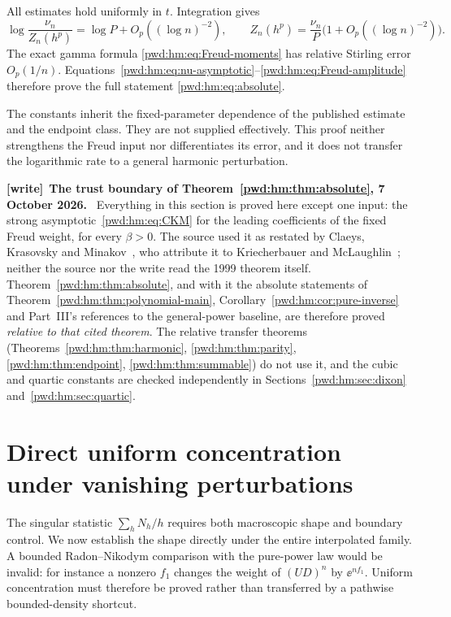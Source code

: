 \documentclass[11pt,letterpaper]{article}
\numberwithin{equation}{section}
\theoremstyle{remark}\newtheorem{remark}[theorem]{Remark}
\newenvironment{writenote}[1][]{\par\smallskip\begingroup\small
 \noindent\textbf{[write]}\if\relax\detokenize{#1}\relax\else~\textbf{#1.}\fi\ }%
 {\par\endgroup\smallskip}
\begin{document}
All estimates hold uniformly in $t$. Integration gives
\[
 \log\frac{\nu_n}{Z_n(h^p)}=\log P+O_p((\log n)^{-2}),
 \qquad
 Z_n(h^p)=\frac{\nu_n}{P}\bigl(1+O_p((\log n)^{-2})\bigr).
\]
The exact gamma formula \eqref{pwd:hm:eq:Freud-moments} has relative Stirling error $O_p(1/n)$. Equations~\eqref{pwd:hm:eq:nu-asymptotic}--\eqref{pwd:hm:eq:Freud-amplitude} therefore prove the full statement \eqref{pwd:hm:eq:absolute}.

The constants inherit the fixed-parameter dependence of the published estimate and the endpoint class. They are not supplied effectively. This proof neither strengthens the Freud input nor differentiates its error, and it does not transfer the logarithmic rate to a general harmonic perturbation.

\begin{writenote}[The trust boundary of Theorem~\ref{pwd:hm:thm:absolute}, 7 October 2026]
Everything in this section is proved here except one input:
the strong asymptotic~\eqref{pwd:hm:eq:CKM} for the leading coefficients of
the fixed Freud weight, for every $\beta>0$. The source used it as restated
by Claeys, Krasovsky and Minakov~\cite[Eq.~(2.3)]{ckm}, who attribute it to
Kriecherbauer and McLaughlin~\cite[Theorem~1.5]{km}; neither the source nor
the write read the 1999 theorem itself. Theorem~\ref{pwd:hm:thm:absolute},
and with it the absolute statements of Theorem~\ref{pwd:hm:thm:polynomial-main},
Corollary~\ref{pwd:hm:cor:pure-inverse} and Part~III's references to the
general-power baseline, are therefore proved \emph{relative to that cited
theorem}. The relative transfer theorems (Theorems~\ref{pwd:hm:thm:harmonic},
\ref{pwd:hm:thm:parity}, \ref{pwd:hm:thm:endpoint}, \ref{pwd:hm:thm:summable})
do not use it, and the cubic and quartic constants are checked independently
in Sections~\ref{pwd:hm:sec:dixon} and~\ref{pwd:hm:sec:quartic}.
\end{writenote}

\section{Direct uniform concentration under vanishing perturbations}\label{pwd:hm:sec:shape}
The singular statistic $\sum_hN_h/h$ requires both macroscopic shape and boundary control. We now establish the shape directly under the entire interpolated family. A bounded Radon--Nikodym comparison with the pure-power law would be invalid: for instance a nonzero $f_1$ changes the weight of $(UD)^n$ by $\ee^{nf_1}$. Uniform concentration must therefore be proved rather than transferred by a pathwise bounded-density shortcut.
\end{document}
